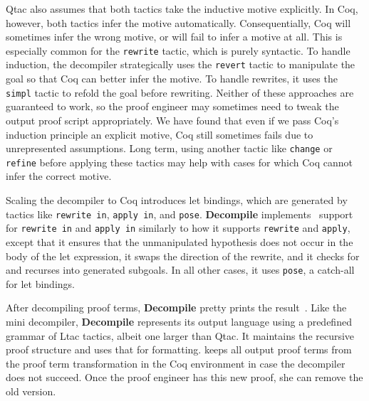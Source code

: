 Qtac also assumes that both tactics take the inductive motive explicitly.
In Coq, however, both tactics infer the motive automatically.
Consequentially, Coq will sometimes infer the wrong motive, %
or will fail to infer a motive at all.
This is especially common for the \lstinline{rewrite} tactic, which is purely syntactic.
To handle induction, the decompiler strategically uses the \lstinline{revert} tactic to manipulate the goal
so that Coq can better infer the motive.
To handle rewrites, it uses the \lstinline{simpl} tactic to refold the goal before rewriting.
Neither of these approaches are guaranteed to work, so the proof engineer may sometimes need to tweak the output proof script appropriately.
We have found that even if we pass Coq's induction principle an explicit motive, Coq still sometimes fails due
to unrepresented assumptions.
Long term, using another tactic like \lstinline{change} or \lstinline{refine} before applying these tactics
may help with cases for which Coq cannot infer the correct motive.

Scaling the decompiler to Coq introduces let bindings, which are generated by 
tactics like \lstinline{rewrite in}, \lstinline{apply in}, and \lstinline{pose}.
\textbf{Decompile} implements~ %
support for \lstinline{rewrite in} and \lstinline{apply in} similarly to how it supports
\lstinline{rewrite} and \lstinline{apply}, except that it ensures that the unmanipulated hypothesis does not occur in the body of the let expression,
it swaps the direction of the rewrite, and it checks for and recurses into generated subgoals.
In all other cases, it uses \lstinline{pose}, a catch-all for let bindings.

After decompiling proof terms, \textbf{Decompile} pretty prints the result~.
Like the mini decompiler, \textbf{Decompile} represents its output language using a predefined grammar of Ltac tactics,
albeit one larger than Qtac.
It maintains the recursive proof structure and uses that for formatting. %
\toolname keeps all output proof terms from the proof term transformation in the Coq environment in case the decompiler does not succeed.
Once the proof engineer has this new proof, she can remove the old version.


